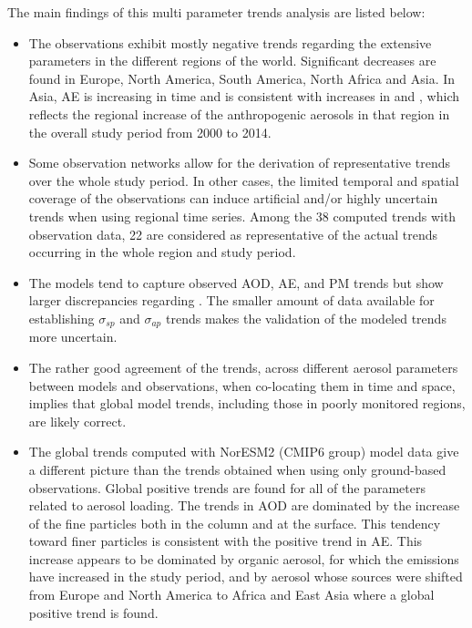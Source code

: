 \documentclass[acp, manuscript]{copernicus}
\begin{document}
The main findings of this multi parameter trends analysis are listed below:
\begin{itemize}
 \item The observations exhibit mostly negative trends regarding the extensive parameters in the different regions of the world. Significant decreases are found in Europe, North America, South America, North Africa and Asia. In Asia, AE is increasing in time and is consistent with increases in  and , which reflects the regional increase of the anthropogenic aerosols in that region in the overall study period from 2000 to 2014.
 \item Some observation networks allow for the derivation of representative trends over the whole study period. In other cases, the limited temporal and spatial coverage of the observations can induce artificial and/or highly uncertain trends when using regional time series. Among the 38 computed trends with observation data, 22 are considered as representative of the actual trends occurring in the whole region and study period.
 \item The models tend to capture observed AOD, AE,  and PM trends but show larger discrepancies regarding . The smaller amount of data available for establishing $\sigma_{sp}$ and $\sigma_{ap}$ trends makes the validation of the modeled trends more uncertain.
 \item The rather good agreement of the trends, across different aerosol parameters between models and observations, when co-locating them in time and space, implies that global model trends, including those in poorly monitored regions, are likely correct.
 \item The global trends computed with NorESM2 (CMIP6 group) model data give a different picture than the trends obtained when using only ground-based observations. Global positive trends are found for all of the parameters related to aerosol loading. The trends in AOD are dominated by the increase of the fine particles both in the column and at the surface. This tendency toward finer particles is consistent with the positive trend in AE. This increase appears to be dominated by organic aerosol, for which the emissions have increased in the study period, and by  aerosol whose sources were shifted from Europe and North America to Africa and East Asia where a global positive  trend is found.
\end{itemize}
\end{document}
